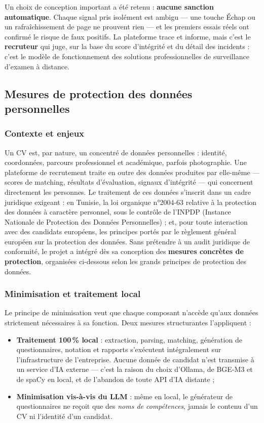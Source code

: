 \documentclass[12pt,a4paper]{report}
\begin{document}
Un choix de conception important a été retenu : \textbf{aucune sanction automatique}. Chaque signal pris isolément est ambigu --- une touche Échap ou un rafraîchissement de page ne prouvent rien --- et les premiers essais réels ont confirmé le risque de faux positifs. La plateforme trace et informe, mais c'est le \textbf{recruteur} qui juge, sur la base du score d'intégrité et du détail des incidents : c'est le modèle de fonctionnement des solutions professionnelles de surveillance d'examen à distance.

\subsection{Mesures de protection des données personnelles}

\subsubsection{Contexte et enjeux}

Un CV est, par nature, un concentré de données personnelles : identité, coordonnées, parcours professionnel et académique, parfois photographie. Une plateforme de recrutement traite en outre des données produites par elle-même --- scores de matching, résultats d'évaluation, signaux d'intégrité --- qui concernent directement les personnes. Le traitement de ces données s'inscrit dans un cadre juridique exigeant : en Tunisie, la loi organique n°2004-63 relative à la protection des données à caractère personnel, sous le contrôle de l'INPDP (Instance Nationale de Protection des Données Personnelles) ; et, pour toute interaction avec des candidats européens, les principes portés par le règlement général européen sur la protection des données. Sans prétendre à un audit juridique de conformité, le projet a intégré dès sa conception des \textbf{mesures concrètes de protection}, organisées ci-dessous selon les grands principes de protection des données.

\subsubsection{Minimisation et traitement local}

Le principe de minimisation veut que chaque composant n'accède qu'aux données strictement nécessaires à sa fonction. Deux mesures structurantes l'appliquent :

\begin{itemize}
  \item \textbf{Traitement 100\,\% local} : extraction, parsing, matching, génération de questionnaires, notation et rapports s'exécutent intégralement sur l'infrastructure de l'entreprise. Aucune donnée de candidat n'est transmise à un service d'IA externe --- c'est la raison du choix d'Ollama, de BGE-M3 et de spaCy en local, et de l'abandon de toute API d'IA distante ;
  \item \textbf{Minimisation vis-à-vis du LLM} : même en local, le générateur de questionnaires ne reçoit que des \textit{noms de compétences}, jamais le contenu d'un CV ni l'identité d'un candidat.
\end{itemize}
\end{document}
